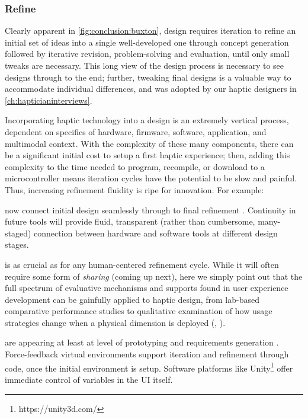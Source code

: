 



%
%
\subsubsection{Refine}
Clearly apparent in \autoref{fig:conclusion:buxton}, design requires iteration to refine an initial set of ideas into a single well-developed one through concept generation followed by iterative revision, problem-solving and  evaluation, until only small tweaks are necessary.
This long view of the design process is necessary to see designs through to the end;
further, tweaking final designs is a valuable way to accommodate individual differences, and was adopted by our haptic designers in \autoref{ch:hapticianinterviews}.

Incorporating haptic technology into a design is an extremely vertical process,  dependent on  specifics of hardware, firmware, software, application, and multimodal context.
With the complexity of these many components, there can be a significant initial cost to setup a first haptic experience; then, adding this complexity to the time needed to program, recompile, or download to a microcontroller means iteration cycles have the potential to be slow and painful. 
%
Thus, increasing refinement fluidity is ripe for innovation. For example:

 now connect initial design seamlessly through to final refinement \cite{schneider2015tactile,Schneider2016macaron}.
Continuity in future tools will provide fluid, transparent (rather than cumbersome, many-staged) connection between hardware and software tools at different design stages.

 is as crucial as for any human-centered refinement cycle. While it will often require some form of \textit{sharing} (coming up next), here we simply point out that the full spectrum of evaluative mechanisms and supports found in user experience development can be gainfully applied to haptic design, from lab-based comparative performance studies to qualitative examination of how usage strategies change when a physical dimension is deployed (\eg, \cite{minaker:2016:EH:handson}).

 are appearing at least at level of prototyping and requirements generation \cite{SchneiderAsiaHaptics2014,Seifi2014}. 
Force-feedback virtual environments support iteration and refinement through code, once the initial environment is setup.
Software platforms like Unity\footnote{https://unity3d.com/} offer immediate control of variables in the UI itself.

